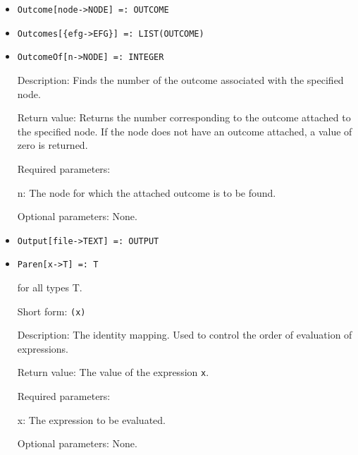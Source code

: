 \begin{itemize}
\item
\protect \large \begin{verbatim}
Outcome[node->NODE] =: OUTCOME
\end{verbatim}\normalsize

\item
\protect \large \begin{verbatim}
Outcomes[{efg->EFG}] =: LIST(OUTCOME)
\end{verbatim}\normalsize



\item
\protect \large \begin{verbatim}
OutcomeOf[n->NODE] =: INTEGER
\end{verbatim}\normalsize

\bd

\item
[Description:] Finds the number of the outcome associated with the
specified node.
\item
[Return value:] Returns the number corresponding to the outcome
attached to the specified node.  If the node does not have an outcome
attached, a value of zero is returned.
\item
[Required parameters:]\hfil\null
	
\bd
\item
[n:] The node for which the attached outcome is to be found.
\ed

\item
[Optional parameters:] None.
\ed

\item
\protect \large \begin{verbatim}
Output[file->TEXT] =: OUTPUT
\end{verbatim}\normalsize



\item
\protect \large \begin{verbatim}
Paren[x->T] =: T
\end{verbatim}\normalsize

for all types T.

\bd
\item
[Short form:] \verb+(x)+
\item
[Description:] The identity mapping.  Used to control the order of evaluation
of expressions.
\item
[Return value:] The value of the expression \verb+x+.
\item
[Required parameters:]\hfil\null
\bd
\item
[x:] The expression to be evaluated.
\ed
\item
[Optional parameters:] None.
\ed


\end{itemize}
